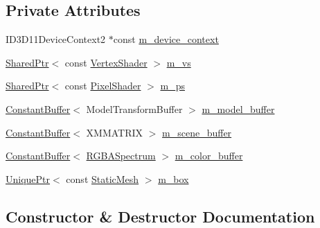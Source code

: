 \subsection*{Private Attributes}
\begin{DoxyCompactItemize}
\item 
I\+D3\+D11\+Device\+Context2 $\ast$const \hyperlink{classmage_1_1_bounding_volume_pass_aebca32235cd63881376bcb465976238f}{m\+\_\+device\+\_\+context}
\item 
\hyperlink{namespacemage_a1e01ae66713838a7a67d30e44c67703e}{Shared\+Ptr}$<$ const \hyperlink{classmage_1_1_vertex_shader}{Vertex\+Shader} $>$ \hyperlink{classmage_1_1_bounding_volume_pass_a3d447a3eec97d5ae740c3ad0fdf49f0f}{m\+\_\+vs}
\item 
\hyperlink{namespacemage_a1e01ae66713838a7a67d30e44c67703e}{Shared\+Ptr}$<$ const \hyperlink{namespacemage_ac98506b7edd999ea43ec46fbd0330238}{Pixel\+Shader} $>$ \hyperlink{classmage_1_1_bounding_volume_pass_ab0000ab42165d94025a6725cc93aa9be}{m\+\_\+ps}
\item 
\hyperlink{structmage_1_1_constant_buffer}{Constant\+Buffer}$<$ Model\+Transform\+Buffer $>$ \hyperlink{classmage_1_1_bounding_volume_pass_a682316c61230844ce232b17c2d03c702}{m\+\_\+model\+\_\+buffer}
\item 
\hyperlink{structmage_1_1_constant_buffer}{Constant\+Buffer}$<$ X\+M\+M\+A\+T\+R\+IX $>$ \hyperlink{classmage_1_1_bounding_volume_pass_a349e8ef04cf8204023952639f4be21d1}{m\+\_\+scene\+\_\+buffer}
\item 
\hyperlink{structmage_1_1_constant_buffer}{Constant\+Buffer}$<$ \hyperlink{structmage_1_1_r_g_b_a_spectrum}{R\+G\+B\+A\+Spectrum} $>$ \hyperlink{classmage_1_1_bounding_volume_pass_ab5413b2a3077e32f8a0e6085b912a46b}{m\+\_\+color\+\_\+buffer}
\item 
\hyperlink{namespacemage_a3316d7143a973e37adf1110f2e80ca31}{Unique\+Ptr}$<$ const \hyperlink{classmage_1_1_static_mesh}{Static\+Mesh} $>$ \hyperlink{classmage_1_1_bounding_volume_pass_a1cb4768ff21923ea947ff07483c3dec3}{m\+\_\+box}
\end{DoxyCompactItemize}


\subsection{Constructor \& Destructor Documentation}
\hypertarget{classmage_1_1_bounding_volume_pass_ab32eb9086e463f5260f8999b78b55b26}{}\label{classmage_1_1_bounding_volume_pass_ab32eb9086e463f5260f8999b78b55b26} 

